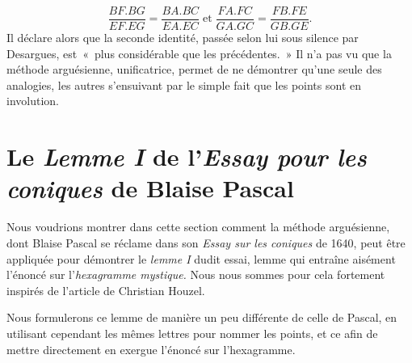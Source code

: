 \documentclass[12pt, a4paper]{article}
\begin{document}
\[
\frac{BF.BG}{EF.EG}=\frac{BA.BC}{EA.EC}\;\mbox{et}\;\frac{FA.FC}{GA.GC}=\frac{FB.FE}{GB.GE}.
\]
Il déclare alors que la seconde identité, passée selon lui sous silence par Desargues, est~«~plus considérable que les précédentes.~» Il n'a pas vu que la méthode arguésienne, unificatrice, permet de ne démontrer qu'une seule des analogies, les autres s'ensuivant par le simple fait que les points sont en involution. 
\section{Le \textit{Lemme I} de l'\textit{Essay pour les coniques} de Blaise Pascal}
Nous voudrions montrer dans cette section comment la méthode arguésienne, dont Blaise Pascal se réclame dans son \textit{Essay sur les coniques} de 1640, peut être appliquée pour démontrer le \textit{lemme I} dudit essai, lemme qui entraîne aisément l'énoncé sur l'\textit{hexagramme mystique.} Nous nous sommes pour cela fortement inspirés de l'article  \cite{houzel-pascal} de Christian Houzel.

Nous formulerons ce lemme de manière un peu différente de celle de Pascal, en utilisant cependant les mêmes lettres pour nommer les points, et ce afin de mettre directement en exergue l'énoncé sur l'hexagramme. 
\end{document}
